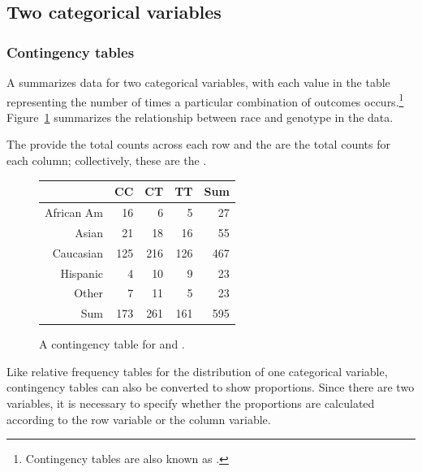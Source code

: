 \textD{\ \\[5mm]}


\subsection{Two categorical variables}
\label{twoCategoricalVariables}
\subsubsection{Contingency tables}

A  summarizes data for two categorical variables, with each value in the table representing the number of times a particular combination of outcomes occurs.\footnote{Contingency tables are also known as .} Figure~\ref{famussContingencyTable} summarizes the relationship between race and genotype in the  data.

The  provide the total counts across each row and the  are the total counts for each column; collectively, these are the .

\begin{figure}[ht]
	\centering
	\begin{tabular}{rrrrr}
		\hline
		& CC & CT & TT & Sum \\ 
		\hline
		African Am & 16 & 6 & 5 & 27 \\ 
		Asian & 21 & 18 & 16 & 55 \\ 
		Caucasian & 125 & 216 & 126 & 467 \\ 
		Hispanic & 4 & 10 & 9 & 23 \\ 
		Other & 7 & 11 & 5 & 23 \\ 
		Sum & 173 & 261 & 161 & 595 \\ 
		\hline
	\end{tabular}
	\caption{A contingency table for  and .} 
	\label{famussContingencyTable}
\end{figure}

\textD{\newpage}

Like relative frequency tables for the distribution of one categorical variable, contingency tables can also be converted to show proportions. Since there are two variables, it is necessary to specify whether the proportions are calculated according to the row variable or the column variable. 

